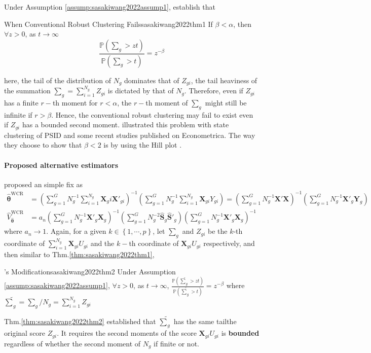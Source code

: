 \documentclass[twoside]{article}
\begin{document}
Under Assumption \ref{assump:sasakiwang2022assump1}, \citet{sasaki2022non} establish that 
\begin{theorem}{When Conventional Robust Clustering Fails}{sasakiwang2022thm1}
    If $\beta<\alpha$, then $\forall z>0$, as $t\rightarrow\infty$ $$ \frac{\mathbb{P}\left(\sum_g > zt\right)}{\mathbb{P}\left(\sum_g >t\right)} = z^{-\beta} $$
\end{theorem}
here, the tail of the distribution of $N_g$ dominates that of $Z_{gi}$, the tail heaviness of the summation $\sum_g = \sum^{N_g}_{i=1}Z_{gi}$ is dictated by that of $N_g$. Therefore, even if $Z_{gi}$ has a finite $r-$th moment for $r<\alpha$,
the $r-$th moment of $\sum_g$ might still be infinite if $r>\beta$. Hence, the conventional robust clustering may fail to exist even if $Z_{gi}$ has a bounded second moment. \citet{sasaki2022non} illustrated this problem with state clustering of PSID and 
some recent studies published on Econometrica. The way they choose to show that $\beta<2$ is by using the Hill plot \citep{drees2000make}.

\paragraph*{Proposed alternative estimators} \citet{sasaki2022non} proposed an simple fix as 
\begin{align*}
    \hat{\boldsymbol{\theta}}^{\mathrm{WCR}} &= \left(\sum^G_{g=1}N^{-1}_{g}\sum^{N_g}_{i=1}\mathbf{X}_gi\mathbf{X}'_{gi}\right)^{-1} \left(\sum^G_{g=1}N^{-1}_{g}\sum^{N_g}_{i=1}\mathbf{X}_{gi}Y_{gi}\right) = \left(\sum^G_{g=1}N^{-1}_{g}\mathbf{X}'\mathbf{X}\right)^{-1}\left(\sum^G_{g=1}N^{-1}_{g}\mathbf{X}'_g\mathbf{Y}_g\right) \\
    \hat{V}_{\hat{\boldsymbol{\theta}}}^{\mathrm{WCR}} &= a_n \left(\sum^G_{g=1} N^{-1}_{g}\mathbf{X}'_g\mathbf{X}_g \right)^{-1} \left(\sum^G_{g=1} N^{-2}_{g}\hat{\mathbf{S}}_g \hat{\mathbf{S}}'_g \right) \left(\sum^G_{g=1}N^{-1}_{g} \mathbf{X}'_g\mathbf{X}_g \right)^{-1}
\end{align*}
where $a_n\rightarrow 1$. Again, for a given $k\in \left\{1,\cdots, p\right\}$, let $\sum_g$ and $Z_{gi}$ be the $k$-th coordinate of $\sum^{N_g}_{i=1} \mathbf{X}_{gi}U_{gi}$ and the $k-$th coordinate of $ \mathbf{X}_{gi}U_{gi}$ respectively, and then similar to Thm.\ref{thm:sasakiwang2022thm1},
\begin{theorem}{\citet{sasaki2022non}'s Modification}{sasakiwang2022thm2}
    Under Assumption \ref{assump:sasakiwang2022assump1}, $\forall z>0$, as $t\rightarrow\infty$, $ \frac{\mathbb{P}\left(\tilde{\sum}_g > zt\right)}{\mathbb{P}\left(\tilde{\sum}_g >t\right)} = z^{-\beta} $ where $\tilde{\sum}_g = \sum_g/N_g = \sum^{N_g}_{i=1}Z_{gi}$
\end{theorem}
Thm.\ref{thm:sasakiwang2022thm2} established that $\tilde{\sum}_g$ has the same tailthe original score $Z_{gi}$. It requires the second moments of the score $\mathbf{X}_{gi}U_{gi}$ is \textbf{bounded} regardless of whether the second moment of $N_g$ if finite or not.
\end{document}
